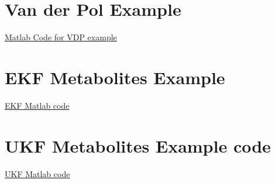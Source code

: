 


\chapter{Van der Pol Example}
\label{Van der Pol Code}
\href{https://github.com/lindseytam/Kalman_Filters/tree/master/Unscented_KFs/MatLab_vdp_Example}{Matlab Code for VDP example}

\let\clearpage\relax

\chapter{EKF Metabolites Example}
\label{EKF metabolites example code}
\href{https://github.com/lindseytam/Kalman_Filters/tree/master/Extended_KFs/Meskin}{EKF Matlab code} 

\let\clearpage\relax

\chapter{UKF Metabolites Example code}
\label{UKF metabolites example code}
\href{https://github.com/lindseytam/Kalman_Filters/tree/master/Unscented_KFs/Meskin}{UKF Matlab code}
